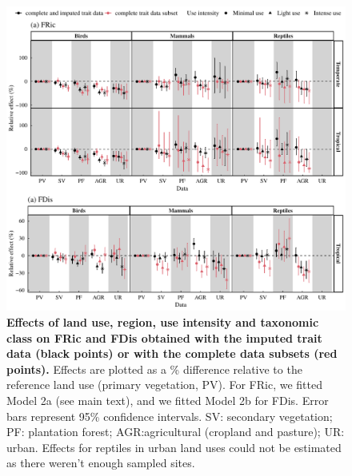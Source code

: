 \begin{figure}[h!]
\centering
\includegraphics[scale=0.7]{Supporting/Chapter3/Figures/SI_Comparison_complete}
\caption[Effects of land use, region, use intensity and taxonomic class on FRic and FDis obtained with the imputed trait data (black points) or with the complete data subsets (red points)]{\textbf{Effects of land use, region, use intensity and taxonomic class on FRic and FDis obtained with the imputed trait data (black points) or with the complete data subsets (red points).} Effects are plotted as a \% difference relative to the reference land use (primary vegetation, PV). For FRic, we fitted Model 2a (see main text), and we fitted Model 2b for FDis. Error bars represent 95\% confidence intervals. SV: secondary vegetation; PF: plantation forest; AGR:agricultural (cropland and pasture); UR: urban. Effects for reptiles in urban land uses could not be estimated as there weren’t enough sampled sites.}
\label{}
\end{figure}

